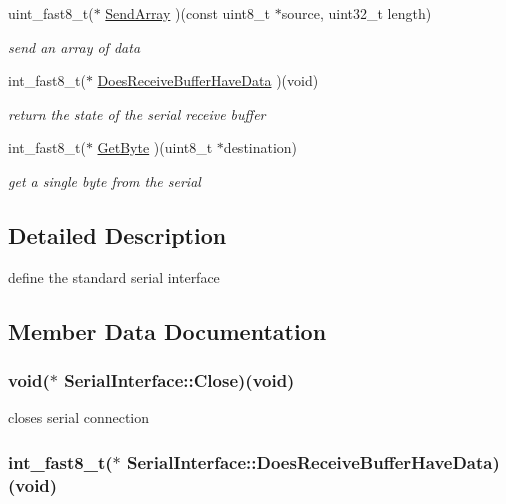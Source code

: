 \begin{DoxyCompactItemize}
uint\-\_\-fast8\-\_\-t($\ast$ \hyperlink{struct_serial_interface_a2f49f38e4a372077a2755eb5e7884b35}{Send\-Array} )(const uint8\-\_\-t $\ast$source, uint32\-\_\-t length)
\begin{DoxyCompactList}\small\item\em send an array of data \end{DoxyCompactList}\item 
int\-\_\-fast8\-\_\-t($\ast$ \hyperlink{struct_serial_interface_a3c8c5895d4ebeaa8d1bf911c7f5e9dbd}{Does\-Receive\-Buffer\-Have\-Data} )(void)
\begin{DoxyCompactList}\small\item\em return the state of the serial receive buffer \end{DoxyCompactList}\item 
int\-\_\-fast8\-\_\-t($\ast$ \hyperlink{struct_serial_interface_a318df81760d2f0b0fb209fc39594b45e}{Get\-Byte} )(uint8\-\_\-t $\ast$destination)
\begin{DoxyCompactList}\small\item\em get a single byte from the serial \end{DoxyCompactList}\end{DoxyCompactItemize}


\subsection{Detailed Description}
define the standard serial interface 

\subsection{Member Data Documentation}
\hypertarget{struct_serial_interface_a6a28860e0cb0ab7a3f9c49527e883685}{
\subsubsection[{Close}]{\setlength{\rightskip}{0pt plus 5cm}void($\ast$ Serial\-Interface\-::\-Close)(void)}}\label{struct_serial_interface_a6a28860e0cb0ab7a3f9c49527e883685}


closes serial connection 

\hypertarget{struct_serial_interface_a3c8c5895d4ebeaa8d1bf911c7f5e9dbd}{
\subsubsection[{Does\-Receive\-Buffer\-Have\-Data}]{\setlength{\rightskip}{0pt plus 5cm}int\-\_\-fast8\-\_\-t($\ast$ Serial\-Interface\-::\-Does\-Receive\-Buffer\-Have\-Data)(void)}}\label{struct_serial_interface_a3c8c5895d4ebeaa8d1bf911c7f5e9dbd}


